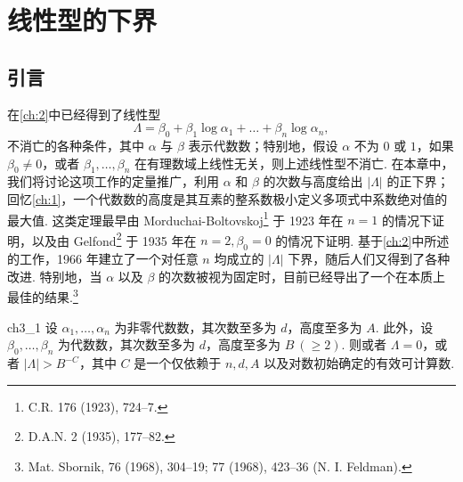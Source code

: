 
\chapter{线性型的下界}\label{ch:3}

\section{引言}\label{sec:ch3_1}

在\autoref{ch:2}中已经得到了线性型
\[
\Lambda = \beta_0 + \beta_1 \log \alpha_1 + \dots + \beta_n \log \alpha_n,
\]
不消亡的各种条件，其中 $\alpha$ 与 $\beta$ 表示代数数；特别地，假设 $\alpha$ 不为 $0$ 或 $1$，如果 $\beta_0 \neq 0$，或者 $\beta_1, \dots, \beta_n$ 在有理数域上线性无关，则上述线性型不消亡. 在本章中，我们将讨论这项工作的定量推广，利用 $\alpha$ 和 $\beta$ 的次数与高度给出 $|\Lambda|$ 的正下界；回忆\autoref{ch:1}，一个代数数的高度是其互素的整系数极小定义多项式中系数绝对值的最大值. 这类定理最早由 Morduchai-Boltovskoj\footnote{C.R. 176 (1923), 724--7.} 于 1923 年在 $n=1$ 的情况下证明，以及由 Gelfond\footnote{D.A.N. 2 (1935), 177--82.} 于 1935 年在 $n=2, \beta_0=0$ 的情况下证明. 基于\autoref{ch:2}中所述的工作，1966 年建立了一个对任意 $n$ 均成立的 $|\Lambda|$ 下界，随后人们又得到了各种改进. 特别地，当 $\alpha$ 以及 $\beta$ 的次数被视为固定时，目前已经导出了一个在本质上最佳的结果.\footnote{Mat. Sbornik, 76 (1968), 304--19; 77 (1968), 423--36 (N. I. Feldman).}

\begin{mythm}{}{ch3_1}
设 $\alpha_1, \dots, \alpha_n$ 为非零代数数，其次数至多为 $d$，高度至多为 $A$. 此外，设 $\beta_0, \dots, \beta_n$ 为代数数，其次数至多为 $d$，高度至多为 $B \ (\ge 2)$. 则或者 $\Lambda = 0$，或者 $|\Lambda| > B^{-C}$，其中 $C$ 是一个仅依赖于 $n, d, A$ 以及对数初始确定的有效可计算数.
\end{mythm}

